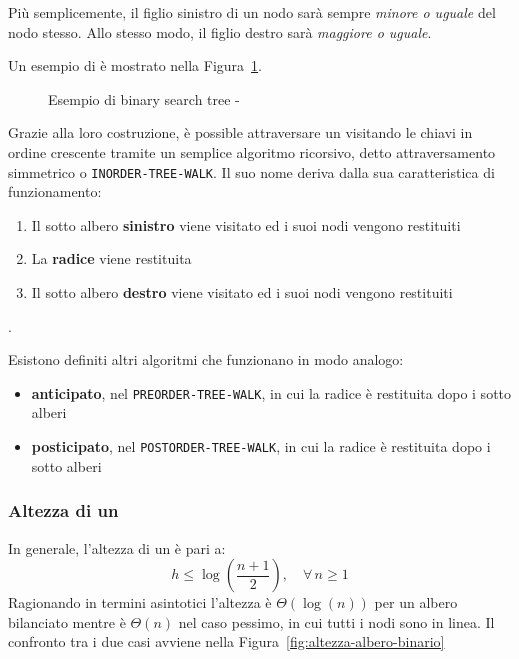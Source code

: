 \documentclass[italian, 10pt]{article}
\begin{document}
Più semplicemente, il figlio sinistro di un nodo sarà sempre \textit{minore o uguale} del nodo stesso.
Allo stesso modo, il figlio destro sarà \textit{maggiore o uguale}.

\bigskip
Un esempio di \BST è mostrato nella Figura~\ref{fig:esempio-bst}.

\begin{figure}[htbp]
  \bigskip
  \centering
  \caption{Esempio di binary search tree - \BST}
  \label{fig:esempio-bst}
  \bigskip
\end{figure}

\bigskip
Grazie alla loro costruzione, è possible attraversare un \BST visitando le chiavi in ordine crescente tramite un semplice algoritmo ricorsivo, detto attraversamento simmetrico o \texttt{INORDER-TREE-WALK}.
Il suo nome deriva dalla sua caratteristica di funzionamento:

\begin{enumerate}
  \item Il sotto albero \textbf{sinistro} viene visitato ed i suoi nodi vengono restituiti
  \item La \textbf{radice} viene restituita
  \item Il sotto albero \textbf{destro} viene visitato ed i suoi nodi vengono restituiti
\end{enumerate}.

\bigskip
Esistono definiti altri algoritmi che funzionano in modo analogo:

\begin{itemize}
  \item \textbf{anticipato}, nel \texttt{PREORDER-TREE-WALK}, in cui la radice è restituita dopo i sotto alberi
  \item \textbf{posticipato}, nel \texttt{POSTORDER-TREE-WALK}, in cui la radice è restituita dopo i sotto alberi
\end{itemize}

\subsubsection{Altezza di un \BST}

In generale, l'altezza di un \BST è pari a:
\[ h \leq \log{\left(\dfrac{n+1}{2}\right)}, \quad \forall \, n \geq 1\]
Ragionando in termini asintotici l'altezza è \(\Theta(\log{(n)})\) per un albero bilanciato mentre è \(\Theta(n)\) nel caso pessimo, in cui tutti i nodi sono in linea.
Il confronto tra i due casi avviene nella Figura~\ref{fig:altezza-albero-binario}
\end{document}
